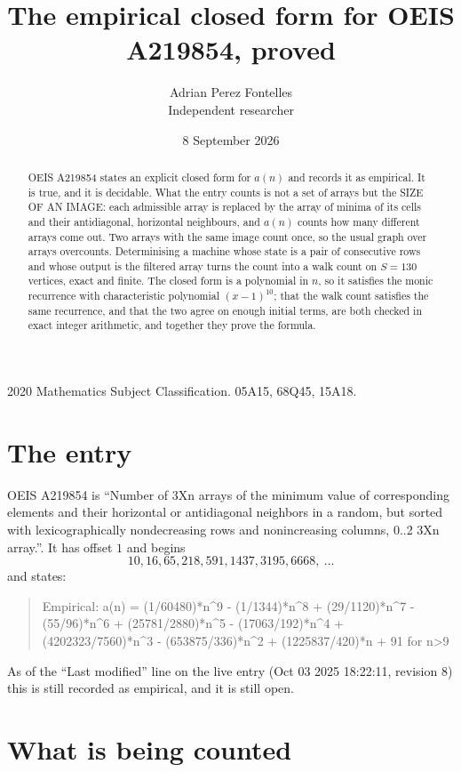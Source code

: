 \documentclass[11pt,a4paper]{article}
\title{The empirical closed form for OEIS A219854, proved}
\author{Adrian Perez Fontelles\\ \small Independent researcher}
\date{8 September 2026}
\theoremstyle{plain}
\theoremstyle{definition}
\begin{document}
\maketitle

\begin{abstract}
OEIS A219854 states an explicit closed form for $a(n)$ and records it as empirical. It is true, and
it is decidable. What the entry counts is not a set of arrays but the SIZE OF AN IMAGE: each
admissible array is replaced by the array of minima of its cells and their antidiagonal, horizontal neighbours,
and $a(n)$ counts how many different arrays come out. Two arrays with the same image count
once, so the usual graph over arrays overcounts. Determinising a machine whose state is a pair
of consecutive rows and whose output is the filtered array turns the count into a walk count on
$S=130$ vertices, exact and finite. The closed form is a polynomial in $n$, so it satisfies the
monic recurrence with characteristic polynomial $(x-1)^{10}$; that the walk count
satisfies the same recurrence, and that the two agree on enough initial terms, are both checked
in exact integer arithmetic, and together they prove the formula.
\end{abstract}

\noindent\small 2020 Mathematics Subject Classification. 05A15, 68Q45, 15A18.\normalsize

\section{The entry}

OEIS A219854 is ``Number of 3Xn arrays of the minimum value of corresponding elements and their horizontal or antidiagonal neighbors in a random, but sorted with lexicographically nondecreasing rows and nonincreasing columns, 0..2 3Xn array.''. It has offset $1$ and begins
\[
10, 16, 65, 218, 591, 1437, 3195, 6668,\ \dots
\]
and states:
\begin{quote}
Empirical: a(n) = (1/60480)*n\^{}9 - (1/1344)*n\^{}8 + (29/1120)*n\^{}7 - (55/96)*n\^{}6 + (25781/2880)*n\^{}5 - (17063/192)*n\^{}4 + (4202323/7560)*n\^{}3 - (653875/336)*n\^{}2 + (1225837/420)*n + 91 for n>9
\end{quote}
As of the ``Last modified'' line on the live entry (Oct 03 2025 18:22:11, revision 8)
this is still recorded as empirical, and it is still open.

\section{What is being counted}
\end{document}
